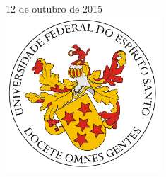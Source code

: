 \documentclass[a4paper,12pt]{article}
\begin{document}
\begin{titlepage}


{\large 12 de outubro de 2015}\\[2cm] %


\includegraphics[width=58mm]{LogoUfes.png}\\[1cm] %


\vfill %

\end{titlepage}





\begin{abstract}
Trabalho da disciplina de Estrutura de Dados II, que consiste na implementação 
de uma máquina de busca utilizando duas estruturas de dados distintas. As 
estruturas são Tabela de Dispersão e Árvore B. Para o tratamento de colisões 
da Tabela de Dispersão foram empregados três estratégias: Hashing Linear, 
Encadeamento e Rehashing. 
\end{abstract}
\end{document}
